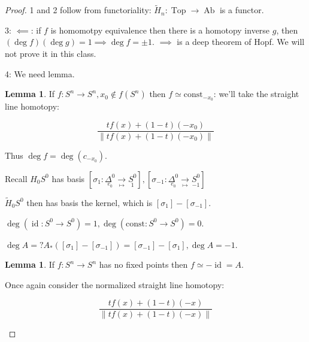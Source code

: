 \documentclass{article}
\theoremstyle{definition}
\newtheorem{lemma}[theorem]{Lemma}
\begin{document}
    \begin{proof}
        1 and 2 follow from functoriality: \(\widetilde{H}_n: \operatorname{Top} \to \operatorname{Ab}\) is a functor.

        3: \(\impliedby\): if \(f\) is homomotpy equivalence then there is a homotopy inverse \(g\), then \((\deg f)(\deg g) = 1 \implies \deg f = \pm 1\). \(\implies\) is a deep theorem of Hopf. We will not prove it in this class.

        4: We need lemma.

        \begin{lemma}
            If \(f: S^n \to S^n, x_0\notin f(S^n)\) then \(f \simeq \text{const}_{-x_0}\): we'll take the straight line homotopy:

            \[
                \frac{t f(x) + (1-t)(-x_0)}{\left\lVert t f(x) + (1-t)(-x_0) \right\rVert }
            \]

            Thus \(\deg f = \deg(c_{-x_0})\).
        \end{lemma}

        \begin{center}
        \end{center}

        \begin{center}
        \end{center}

        Recall \(H_0 S^0\) has basis \(\left[ \sigma_1: \underset{e_0}{\Delta^0} \xrightarrow[\mapsto]{} \underset{1}{S^0}\right], \left[ \sigma_{-1}: \underset{e_0}{\Delta^0} \xrightarrow[\mapsto]{} \underset{-1}{S^0}\right] \) 

        \(\widetilde{H}_0 S^0\) then has basis the kernel, which is \([\sigma_1] - [\sigma_{-1}]\).

        \(\deg(\operatorname{id}: S^0 \to S^0) = 1, \deg (\text{const}: S^0 \to S^0) = 0\).
        
        \(\deg A = ? A_{\ast} ([\sigma_1]-[\sigma_{-1}]) = [\sigma_{-1}] - [\sigma_1], \deg A = -1\).
        
        \begin{lemma}
            If \(f: S^n \to S^n\) has no fixed points then \(f\simeq -\operatorname{id} = A\).

            Once again consider the normalized straight line homotopy:

            \[
                \frac{tf(x) + (1-t)(-x)}{\left\lVert tf(x) + (1-t)(-x) \right\rVert }
            \]
        \end{lemma}

    \end{proof}
\end{document}
